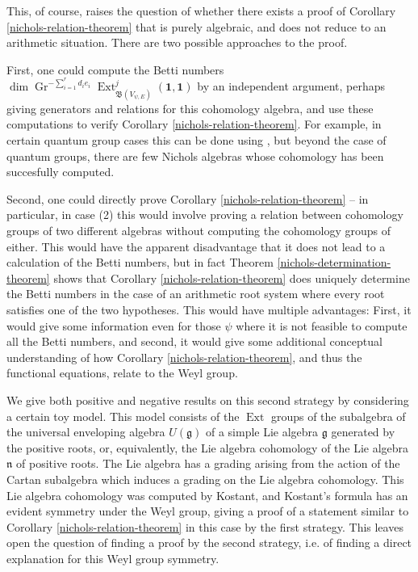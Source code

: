 \documentclass[11pt,letterpaper]{article}
\theoremstyle{definition}
\theoremstyle{remark}
\numberwithin{equation}{section}
\theoremstyle{dotless}
\newcommand{\Gr}{\operatorname{Gr}}
\newcommand{\hchi}{\psi} %
\newcommand{\Ext}{\operatorname{Ext}}
\begin{document}
This, of course, raises the question of whether there exists a proof of Corollary \ref{nichols-relation-theorem} that is purely algebraic, and does not reduce to an arithmetic situation. There are two possible approaches to the proof.

First, one could compute the Betti numbers $\dim \Gr^{ -\sum_{i=1}^r d_i e_i}  \operatorname{Ext}^{j } _{ \mathfrak B( V_{\hchi,E} )} (\mathbf 1, \mathbf 1)$ by an independent argument, perhaps giving generators and relations for this cohomology algebra, and use these computations to verify Corollary \ref{nichols-relation-theorem}. For example, in certain quantum group cases this can be done using \cite[Theorem 5.6.1]{Drupieski2012}, but beyond the case of quantum groups, there are few Nichols algebras whose cohomology has been succesfully computed.

Second, one could directly prove Corollary \ref{nichols-relation-theorem} -- in particular, in case (2) this would involve proving a relation between cohomology groups of two different algebras without computing the cohomology groups of either. This would have the apparent disadvantage that it does not lead to a calculation of the Betti numbers, but in fact Theorem \ref{nichols-determination-theorem} shows that Corollary \ref{nichols-relation-theorem} does uniquely determine the Betti numbers in the case of an arithmetic root system where every root satisfies one of the two hypotheses. This would have multiple advantages: First, it would give some information even for those $\hchi$ where it is not feasible to compute all the Betti numbers, and second, it would give some additional conceptual understanding of how Corollary \ref{nichols-relation-theorem}, and thus the functional equations, relate to the Weyl group.

We give both positive and negative results on this second strategy by considering a certain toy model.   This model consists of the $\Ext$ groups of the subalgebra of the universal enveloping algebra $U(\mathfrak g)$ of a simple Lie algebra $\mathfrak g$ generated by the positive roots, or, equivalently, the Lie algebra cohomology of the Lie algebra $\mathfrak n$ of positive roots. The Lie algebra has a grading arising from the action of the Cartan subalgebra which induces a grading on the Lie algebra cohomology. This Lie algebra cohomology was computed by Kostant, and Kostant's formula has an evident symmetry under the Weyl group, giving a proof of a statement similar to Corollary \ref{nichols-relation-theorem} in this case by the first strategy. This leaves open the question of finding a proof by the second strategy, i.e. of finding a direct explanation for this Weyl group symmetry.
\end{document}
